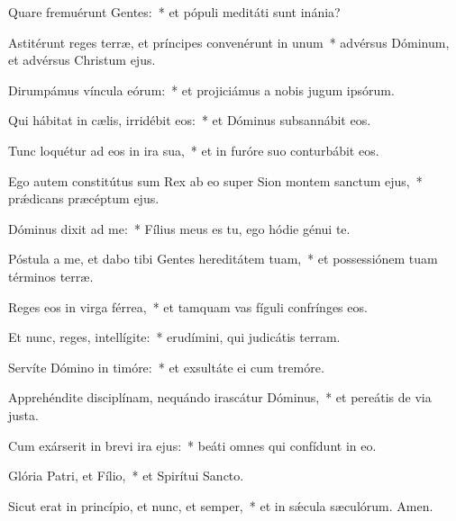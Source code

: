 \item Quare fremuérunt Gentes:~* et pópuli meditáti sunt inánia?

\item Astitérunt reges terræ, et príncipes convenérunt in unum~* advérsus Dóminum, et advérsus Christum ejus.

\item Dirumpámus víncula eórum:~* et projiciámus a nobis jugum ipsórum.

\item Qui hábitat in cælis, irridébit eos:~* et Dóminus subsannábit eos.

\item Tunc loquétur ad eos in ira sua,~* et in furóre suo conturbábit eos.

\item Ego autem constitútus sum Rex ab eo super Sion montem sanctum ejus,~* prǽdicans præcéptum ejus.

\item Dóminus dixit ad me:~* Fílius meus es tu, ego hódie génui te.

\item Póstula a me, et dabo tibi Gentes hereditátem tuam,~* et possessiónem tuam términos terræ.

\item Reges eos in virga férrea,~* et tamquam vas fíguli confrínges eos.

\item Et nunc, reges, intellígite:~* erudímini, qui judicátis terram.

\item Servíte Dómino in timóre:~* et exsultáte ei cum tremóre.

\item Apprehéndite disciplínam, nequándo irascátur Dóminus,~* et pereátis de via justa.

\item Cum exárserit in brevi ira ejus:~* beáti omnes qui confídunt in eo.

\item Glória Patri, et Fílio,~* et Spirítui Sancto.

\item Sicut erat in princípio, et nunc, et semper,~* et in sǽcula sæculórum. Amen.

